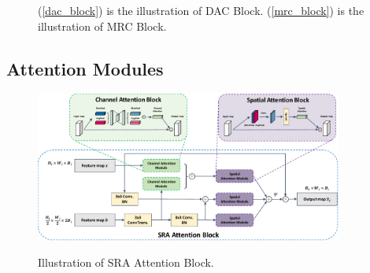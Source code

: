 \documentclass{ieeeaccess}
\begin{document}
\begin{figure}[htbp]
    \xdef\xfigwd{\textwidth}%
    \centering
    \qquad
    \caption{(\ref{dac_block}) is the illustration of DAC Block. (\ref{mrc_block}) is the illustration of MRC Block.}
    
\end{figure}

\subsection{Attention Modules}
\begin{figure}[htbp]
    \xdef\xfigwd{\textwidth}%
    \centering
    \includegraphics[width=0.9\textwidth]{figure/Attention.pdf}
    \label{fig:overview}
    \caption{Illustration of SRA Attention Block.}
\end{figure}
\end{document}
